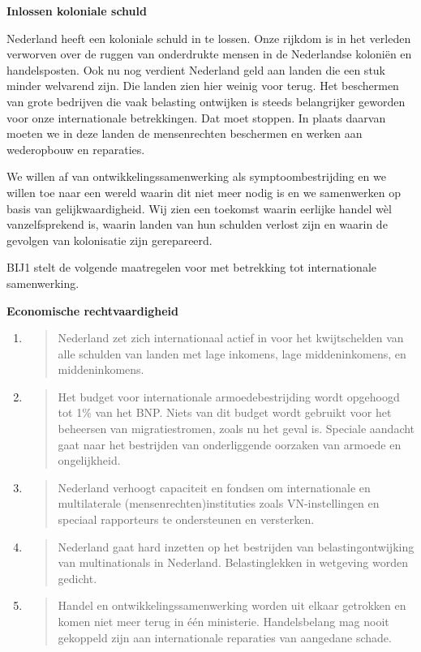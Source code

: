 \textbf{Inlossen koloniale schuld}

Nederland heeft een koloniale schuld in te lossen. Onze rijkdom is in
het verleden verworven over de ruggen van onderdrukte mensen in de
Nederlandse koloniën en handelsposten. Ook nu nog verdient Nederland
geld aan landen die een stuk minder welvarend zijn. Die landen zien hier
weinig voor terug. Het beschermen van grote bedrijven die vaak belasting
ontwijken is steeds belangrijker geworden voor onze internationale
betrekkingen. Dat moet stoppen. In plaats daarvan moeten we in deze
landen de mensenrechten beschermen en werken aan wederopbouw en
reparaties.

We willen af van ontwikkelingssamenwerking als symptoombestrijding en we
willen toe naar een wereld waarin dit niet meer nodig is en we
samenwerken op basis van gelijkwaardigheid. Wij zien een toekomst waarin
eerlijke handel wèl vanzelfsprekend is, waarin landen van hun schulden
verlost zijn en waarin de gevolgen van kolonisatie zijn gerepareerd.

BIJ1 stelt de volgende maatregelen voor met betrekking tot
internationale samenwerking.

\textbf{Economische rechtvaardigheid}

\begin{enumerate}
\def\labelenumi{\arabic{enumi}.}
\item
  \begin{quote}
  Nederland zet zich internationaal actief in voor het kwijtschelden van
  alle schulden van landen met lage inkomens, lage middeninkomens, en
  middeninkomens.
  \end{quote}
\item
  \begin{quote}
  Het budget voor internationale armoedebestrijding wordt opgehoogd tot
  1\% van het BNP. Niets van dit budget wordt gebruikt voor het
  beheersen van migratiestromen, zoals nu het geval is. Speciale
  aandacht gaat naar het bestrijden van onderliggende oorzaken van
  armoede en ongelijkheid.
  \end{quote}
\item
  \begin{quote}
  Nederland verhoogt capaciteit en fondsen om internationale en
  multilaterale (mensenrechten)instituties zoals VN-instellingen en
  speciaal rapporteurs te ondersteunen en versterken.
  \end{quote}
\item
  \begin{quote}
  Nederland gaat hard inzetten op het bestrijden van belastingontwijking
  van multinationals in Nederland. Belastinglekken in wetgeving worden
  gedicht.
  \end{quote}
\item
  \begin{quote}
  Handel en ontwikkelingssamenwerking worden uit elkaar getrokken en
  komen niet meer terug in één ministerie. Handelsbelang mag nooit
  gekoppeld zijn aan internationale reparaties van aangedane schade.
  \end{quote}
\end{enumerate}

